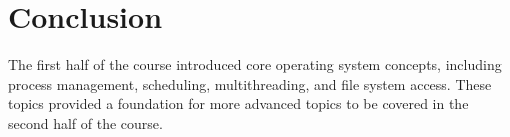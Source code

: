 \documentclass[12pt]{article}
\begin{document}
	\section{Conclusion}
	The first half of the course introduced core operating system concepts, including process management, scheduling, multithreading, and file system access. These topics provided a foundation for more advanced topics to be covered in the second half of the course.
	
\end{document}

